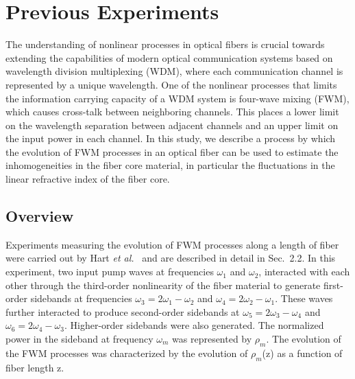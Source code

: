 \appendix
\renewcommand{\thechapter}{A}
\renewcommand{\chaptername}{Appendix}

\chapter{Previous Experiments}

The understanding of nonlinear processes in optical fibers is crucial towards 
extending the capabilities of modern optical communication systems based on 
wavelength division multiplexing (WDM), where each communication channel is 
represented by a unique wavelength. One of the nonlinear processes that 
limits the information carrying capacity of a WDM system is four-wave mixing 
(FWM), which causes cross-talk between neighboring channels. This places a 
lower limit on the wavelength separation between adjacent channels and an
upper limit on the input power in each channel. In this study, we describe
a process by which the evolution of FWM processes in an optical fiber can be 
used to estimate the inhomogeneities in the fiber core material, in particular 
the fluctuations in the linear refractive index of the fiber core.  

\section{Overview}

Experiments measuring the evolution of FWM processes along a length of fiber 
were carried out by Hart {\it et al.}\ \cite{hart1} and are described in detail in 
Sec.\ 2.2. In this experiment, two input pump waves at frequencies
$\omega_1$ and $\omega_2$, interacted with each other through the third-order 
nonlinearity of the fiber material to generate first-order sidebands at frequencies 
$\omega_3 = 2\omega_1 - \omega_2$ and $\omega_4 = 2\omega_2 - \omega_1$. 
These waves further interacted to produce second-order sidebands at 
$\omega_5 = 2\omega_3 - \omega_4$ and $\omega_6 = 2\omega_4 - \omega_3$. 
Higher-order sidebands were also generated. The normalized power in the 
sideband at frequency $\omega_m$ was represented by $\rho_m$. The 
evolution of the FWM processes was characterized by the evolution of 
$\rho_m$(z) as a function of fiber length z. 

